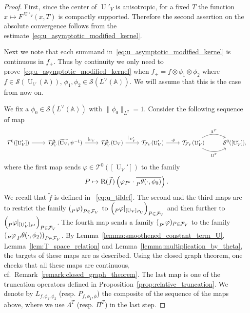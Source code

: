 \documentclass[letterpaper,11pt]{amsart}
\newcommand{\bA}{\mathbb{A}}
\newcommand{\cF}{\mathcal{F}}
\newcommand{\cS}{\mathcal{S}}
\newcommand{\cT}{\mathcal{T}}
\newcommand{\<}{\negthickspace}
\providecommand{\aabs}[1]{\lVert#1\rVert}
\DeclareMathOperator{\U}{U}
\theoremstyle{definition}
\theoremstyle{plain}
\theoremstyle{remark}
\numberwithin{equation}{section}
\begin{document}
\begin{proof}
First, since the center of $\U'_V$ is anisotropic, for a fixed $T$ the
function $x \mapsto F^{\U'_V}(x, T)$ is compactly supported. Therefore the
second assertion on the absolute convergence follows from the
estimate~\eqref{eq:u_asymptotic_modified_kernel}.

Next we note that each summand in~\eqref{eq:u_asymptotic_modified_kernel} is
continuous in $f_+$. Thus by continuity we only need to
prove~\eqref{eq:u_asymptotic_modified_kernel} when $f_+ = f \otimes \phi_1 \otimes \phi_2$ where $f \in \cS(\U_V(\bA))$, $\phi_1,
\phi_2 \in \cS(L^\vee(\bA))$. We will assume that this is the case from now on.

We fix a $\phi_0 \in \cS(L^\vee(\bA))$ with $\aabs{\phi_0}_{L^2} = 1$. Consider
the following sequence of map
    \[
    \begin{tikzcd}
    {\cT^0([\U_V'])} \arrow[r] & \cT^\Delta_{\cF_V}(\widetilde{\U_V},\psi^{-1})
    \arrow[r,"|_{\U_V}"] & \cT^\Delta_{\cF_V}(\U_V) \arrow[r,"|_{\U'_V}"]
    & \cT_{\cF_V}(\U'_V) \arrow[r,"\cdot \theta"]
    & \cT_{\cF_V}(\U'_V) \arrow[r, "\Lambda^T", bend left]
    \arrow[r, "\Pi^T"', bend right] & {\cS^0([\U'_V])},
    \end{tikzcd}
    \]
where the first map sends $\varphi \in \cT^0([\U_V'])$ to the family
    \[
    P \mapsto \mathrm{R}(\widetilde{f})
    \left( \varphi_{P'}
    \cdot \overline{\prescript{}{P}{\theta(\cdot, \phi_0)}} \right).
    \]
We recall that $\widetilde{f}$ is defined in ~\eqref{eq:u_tildef}.
The second and the third maps are to restrict the family $\left(
\prescript{}{P}{\varphi}\right)_{P \in {\cF_V}}$ to
$\left(\prescript{}{P}{\varphi}|_{[\U_V]_{P_{\U}}} \right)_{P \in {\cF_V}}$ and then
further to $\left(\prescript{}{P}{\varphi}|_{[\U'_V]_{P'}} \right)_{P \in
{\cF_V}}$. The fourth map sends a family $(\prescript{}{P'}{\varphi})_{P \in
{\cF_V}}$ to the family $\left(\prescript{}{P}{\varphi}
\prescript{}{P}{\theta(\cdot, \phi_2)}\right)_{P \in {\cF_V}}$. By
Lemma~\ref{lemma:smoothened_constant_term_U},
Lemma~\ref{lem:T_space_relation} and
Lemma~\ref{lemma:multiplication_by_theta}, the targets of these maps are as
described. Using the closed graph theorem, one checks that all these maps are
continuous, cf.~Remark~\ref{remark:closed_graph_theorem}.
The last map is one of the truncation operators defined in
Proposition~\ref{prop:relative_truncation}.
We denote by $L_{f,\phi_1,\phi_2}$ (resp. $P_{f, \phi_1, \phi}$) the composite of the sequence of the maps
above, where we use $\Lambda^T$ (resp. $\Pi^T$) in the last step.


\end{proof}
\end{document}
